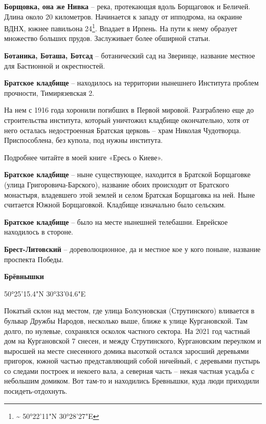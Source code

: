 \medskip

\textbf{Борщовка, она же Нивка} – река, протекающая вдоль Борщаговок и Беличей. Длина около 20 километров. Начинается к западу от ипподрома, на окраине ВДНХ, южнее павильона 24\footnote{\textasciitilde{} 50°22'11"N 30°28'27"E}. Впадает в Ирпень. На пути к нему образует множество больших прудов. Заслуживает более обширной статьи.\\

\medskip

\textbf{Ботаника, Боташа, Ботсад} – ботанический сад на Зверинце, название местное для Бастионной и окрестностей.\\

\medskip

\textbf{Братское кладбище} – находилось на территории нынешнего Института проблем прочности, Тимирязевская 2. 

На нем с 1916 года хоронили погибших в Первой мировой. Разграблено еще до строительства института, который уничтожил кладбище окончательно, хотя от него осталась недостроенная Братская церковь – храм Николая Чудотворца. Приспособлена, без купола, под нужны института.

Подробнее читайте в моей книге «Ересь о Киеве».\\

\medskip

\textbf{Братское кладбище} – ныне существующее, находится в Братской Борщаговке (улица Григо\-ровича-Барского), название обоих происходит от Братского монастыря, владевшего этой землей и селом Братская Борщаговка на ней. Ныне считается Южной Борщаговкой. Кладбище изначально было сельским.\\

\medskip

\textbf{Братское кладбище} – было на месте нынешней телебашни. Еврейское находилось в стороне.\\

\medskip

\textbf{Брест-Литовский} – дореволюционное, да и местное кое у кого поныне, название проспекта Победы.\\

\medskip


\textbf{Брёвнышки}

50°25'15.4"N 30°33'04.6"E

Покатый склон над местом, где улица Болсуновская (Струтинского) вливается в бульвар Дружбы Народов, несколько выше, ближе к улице Кургановской. Там долго, по нулевые, сохранялся осколок частного сектора. На 2021 год частный дом на Кургановской 7 снесен, и между Струтинского, Кургановским переулком и выросшей на месте снесенного домика высоткой остался заросший деревьями пригорок, южной частью представляющий собой ничейный, с деревьями пустырь со следами построек и некоего вала, а северная часть – некая частная усадьба с небольшим домиком. Вот там-то и находились Бревнышки, куда люди приходили посидеть-отдохнуть.

